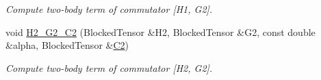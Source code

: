 \begin{DoxyCompactItemize}
\begin{DoxyCompactList}\small\item\em Compute two-\/body term of commutator \mbox{[}H1, G2\mbox{]}. \end{DoxyCompactList}\item 
void \mbox{\hyperlink{classforte_1_1_m_a_s_t_e_r___d_s_r_g_aba555c804e96f32053dc180d78feb2c2}{H2\+\_\+\+G2\+\_\+\+C2}} (Blocked\+Tensor \&H2, Blocked\+Tensor \&G2, const double \&alpha, Blocked\+Tensor \&\mbox{\hyperlink{namespaceforte_abe00ec86d0015c0f2b6ac298c6e428e4af1a543f5a2c5d49bc5dde298fcf716e4}{C2}})
\begin{DoxyCompactList}\small\item\em Compute two-\/body term of commutator \mbox{[}H2, G2\mbox{]}. \end{DoxyCompactList}\end{DoxyCompactItemize}
